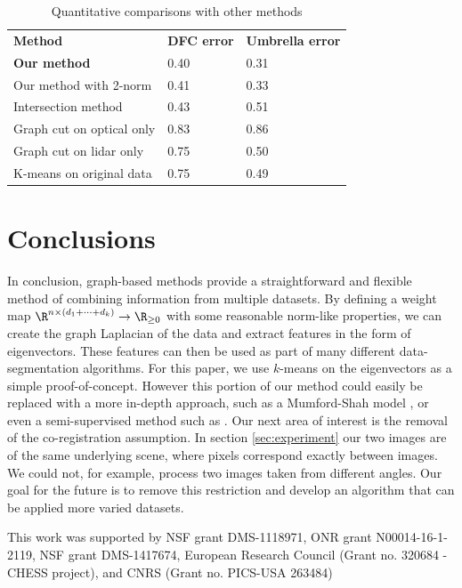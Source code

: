 \documentclass{article}
\begin{document}
\begin{table}
  \centering
  \begin{tabular}{l l l}
    \textbf{Method} & \textbf{DFC error} & \textbf{Umbrella error}\\
    \textbf{Our method} & 0.40 & 0.31 \\
    Our method with 2-norm & 0.41 & 0.33 \\
    Intersection method & 0.43 & 0.51 \\
    Graph cut on optical only & 0.83 & 0.86 \\
    Graph cut on lidar only & 0.75 & 0.50 \\
    K-means on original data & 0.75 & 0.49 \\
  \end{tabular}
  \caption{Quantitative comparisons with other methods}
  \label{table:experimentQuantitative}
\end{table}

\section{Conclusions}
\label{sec:conclusions}

In conclusion, graph-based methods provide a straightforward and flexible method
of combining information from multiple datasets. By defining a weight map
$\R^{n\times\left(d_1+\cdots+d_k\right)}\to\R_{\geq 0}$ with some reasonable
norm-like properties, we can create the graph Laplacian of the data and extract
features in the form of eigenvectors. These features can then be used as part of
many different data-segmentation algorithms. For this paper, we use $k$-means on
the eigenvectors as a simple proof-of-concept. However this portion of our
method could easily be replaced with a more in-depth approach, such as a
Mumford-Shah model \cite{Hu2015}, or even a semi-supervised method such as
\cite{Merkurjev13}. Our next area of interest is the removal of the
co-registration assumption. In section \ref{sec:experiment} our two images are
of the same underlying scene, where pixels correspond exactly between images. We
could not, for example, process two images taken from different angles. Our goal
for the future is to remove this restriction and develop an algorithm that can
be applied more varied datasets.

This work was supported by NSF grant DMS-1118971, ONR grant N00014-16-1-2119,
NSF grant DMS-1417674, European Research Council (Grant no. 320684 - CHESS
project), and CNRS (Grant no. PICS-USA 263484)
\end{document}
